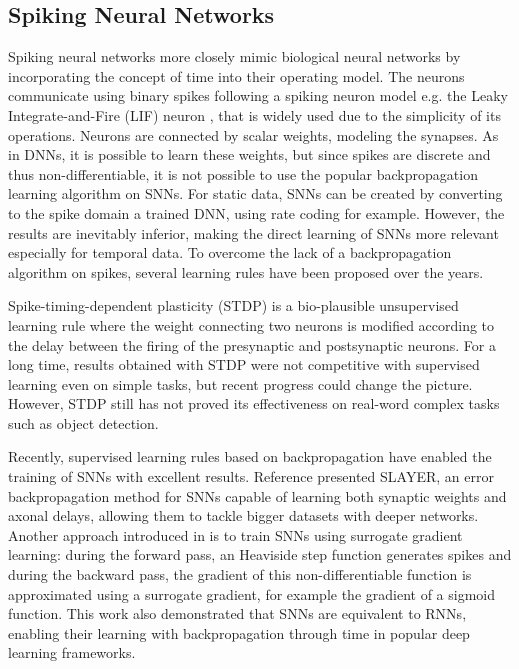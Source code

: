 \documentclass[conference]{IEEEtran}
\begin{document}
\subsection{Spiking Neural Networks}

Spiking neural networks more closely mimic biological neural networks by incorporating the concept of time into their operating model. The neurons communicate using binary spikes following a spiking neuron model e.g. the Leaky Integrate-and-Fire (LIF) neuron \cite{lif}, that is widely used due to the simplicity of its operations. Neurons are connected by scalar weights, modeling the synapses. As in DNNs, it is possible to learn these weights, but since spikes are discrete and thus non-differentiable, it is not possible to use the popular backpropagation learning algorithm on SNNs. For static data, SNNs can be created by converting to the spike domain a trained DNN, using rate coding for example. However, the results are inevitably inferior, making the direct learning of SNNs more relevant especially for temporal data. To overcome the lack of a backpropagation algorithm on spikes, several learning rules have been proposed over the years. 



Spike-timing-dependent plasticity (STDP) \cite{stdp} is a bio-plausible unsupervised learning rule where the weight connecting two neurons is modified according to the delay between the firing of the presynaptic and postsynaptic neurons. For a long time, results obtained with STDP were not competitive with supervised learning even on simple tasks, but recent progress \cite{stdpgood} could change the picture. However, STDP still has not proved its effectiveness on real-word complex tasks such as object detection.

Recently, supervised learning rules based on backpropagation have enabled the training of SNNs with excellent results. Reference \cite{slayer} presented SLAYER, an error backpropagation method for SNNs capable of learning both synaptic weights and axonal delays, allowing them to tackle bigger datasets with deeper networks. Another approach introduced in \cite{neftci} is to train SNNs using surrogate gradient learning: during the forward pass, an Heaviside step function generates spikes and during the backward pass, the gradient of this non-differentiable function is approximated using a surrogate gradient, for example the gradient of a sigmoid function. This work also demonstrated that SNNs are equivalent to RNNs, enabling their learning with backpropagation through time in popular deep learning frameworks.
\end{document}
